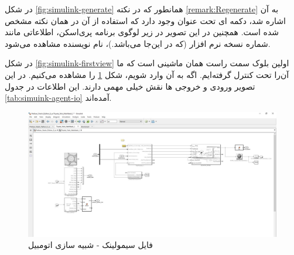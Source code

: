 در شکل 
\ref{fig:simulink-generate}
همانطور که در نکته
\ref{remark:Regenerate} 
به آن اشاره شد، دکمه ای تحت عنوان 
وجود دارد که استفاده از آن در همان نکته مشخص شده است. همچنین در این تصویر در زیر لوگوی برنامه پری‌اسکن، اطلاعاتی مانند شماره نسخه نرم افزار (که در این‌جا  می‌باشد.)، نام نویسنده مشاهده می‌شود.

در شکل 
\ref{fig:simulink-firstview}
اولین بلوک سمت راست همان ماشینی است که ما آن‌را تحت کنترل گرفته‌ایم. اگه به آن وارد شویم، شکل 
\ref{fig:simulink-agent}
را مشاهده می‌کنیم.
در این تصویر ورودی و خروجی ها نقش خیلی مهمی دارند. این اطلاعات در جدول
\ref{tab:simuink-agent-io}
 آمده‌اند.



\begin{figure}[h!]
	\centering
	\includegraphics[width=1\linewidth]{Figures/simulink/agent}
	\caption{فایل سیمولینک - شبیه سازی اتومبیل}
	\label{fig:simulink-agent}
\end{figure}


